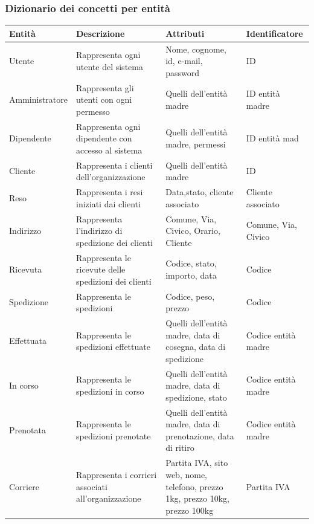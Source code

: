 \subsubsection*{Dizionario dei concetti per entità}
\begin{table}[H]
	\centering
	\begin{tabularx}{\dimexpr{}\arrayrulewidth}{|*{4}{Y|}} %
		\hline
		\textbf{Entità} & \textbf{Descrizione} & \textbf{Attributi} & \textbf{Identificatore} \\ 
    \hline
     Utente & Rappresenta ogni utente del sistema & Nome, cognome, id, e-mail, password & ID \\
    \hline
     Amministratore & Rappresenta gli utenti con ogni permesso & Quelli dell'entità madre & ID entità madre \\
    \hline
     Dipendente & Rappresenta ogni dipendente con accesso al sistema & Quelli dell'entità madre, permessi & ID entità mad \\
    \hline
		 Cliente & Rappresenta i clienti dell'organizzazione & Quelli dell'entità madre & ID \\
		\hline 
		 Reso & Rappresenta i resi iniziati dai clienti & Data,stato, cliente associato & Cliente associato \\
		\hline
		Indirizzo & Rappresenta l'indirizzo di spedizione dei clienti & Comune, Via, Civico, Orario, Cliente & Comune, Via, Civico \\ 
		\hline
		Ricevuta & Rappresenta le ricevute delle spedizioni dei clienti & Codice, stato, importo, data & Codice\\
		\hline
		Spedizione & Rappresenta le spedizioni & Codice, peso, prezzo & Codice \\ 
		\hline
		Effettuata & Rappresenta le spedizioni effettuate & Quelli dell'entità madre, data di cosegna, data di spedizione & Codice entità madre \\
		\hline
		In corso & Rappresenta le spedizioni in corso & Quelli dell'entità madre, data di spedizione, stato & Codice entità madre \\
		\hline
		Prenotata & Rappresenta le spedizioni prenotate & Quelli dell'entità madre, data di prenotazione, data di ritiro & Codice entità madre \\
		\hline
		Corriere & Rappresenta i corrieri associati all'organizzazione & Partita IVA, sito web, nome, telefono, prezzo 1kg, prezzo 10kg, prezzo 100kg & Partita IVA \\
		\hline 
	\end{tabularx}
\end{table}

